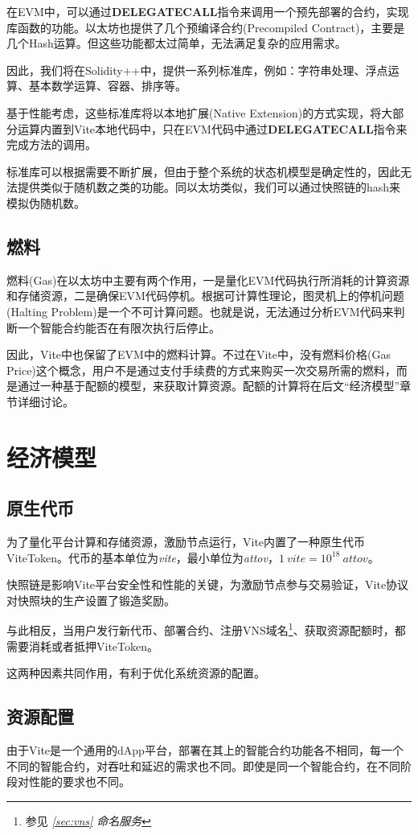 \documentclass[UTF8,nofonts]{ctexart}
\begin{document}
\begin{multicols}{2}
在EVM中，可以通过\textbf{DELEGATECALL}指令来调用一个预先部署的合约，实现库函数的功能。以太坊也提供了几个预编译合约(Precompiled Contract)，主要是几个Hash运算。但这些功能都太过简单，无法满足复杂的应用需求。

因此，我们将在Solidity++中，提供一系列标准库，例如：字符串处理、浮点运算、基本数学运算、容器、排序等。

基于性能考虑，这些标准库将以本地扩展(Native Extension)的方式实现，将大部分运算内置到Vite本地代码中，只在EVM代码中通过\textbf{DELEGATECALL}指令来完成方法的调用。

标准库可以根据需要不断扩展，但由于整个系统的状态机模型是确定性的，因此无法提供类似于随机数之类的功能。同以太坊类似，我们可以通过快照链的hash来模拟伪随机数。

\subsection{燃料}
燃料(Gas)在以太坊中主要有两个作用，一是量化EVM代码执行所消耗的计算资源和存储资源，二是确保EVM代码停机。根据可计算性理论，图灵机上的停机问题(Halting Problem)是一个不可计算问题\cite{haltingproblems}。也就是说，无法通过分析EVM代码来判断一个智能合约能否在有限次执行后停止。

因此，Vite中也保留了EVM中的燃料计算。不过在Vite中，没有燃料价格(Gas Price)这个概念，用户不是通过支付手续费的方式来购买一次交易所需的燃料，而是通过一种基于配额的模型，来获取计算资源。配额的计算将在后文“经济模型”章节详细讨论。

\section{经济模型}
\subsection{原生代币}
为了量化平台计算和存储资源，激励节点运行，Vite内置了一种原生代币ViteToken。代币的基本单位为\textit{vite}，最小单位为\textit{attov}，$1 \: vite = 10^{18} \: attov$。

快照链是影响Vite平台安全性和性能的关键，为激励节点参与交易验证，Vite协议对快照块的生产设置了锻造奖励。

与此相反，当用户发行新代币、部署合约、注册VNS域名\footnote{参见  \textit{\ref{sec:vns} 命名服务}}、获取资源配额时，都需要消耗或者抵押ViteToken。

这两种因素共同作用，有利于优化系统资源的配置。

\subsection{资源配置}
由于Vite是一个通用的dApp平台，部署在其上的智能合约功能各不相同，每一个不同的智能合约，对吞吐和延迟的需求也不同。即使是同一个智能合约，在不同阶段对性能的要求也不同。


\end{multicols}
\end{document}
